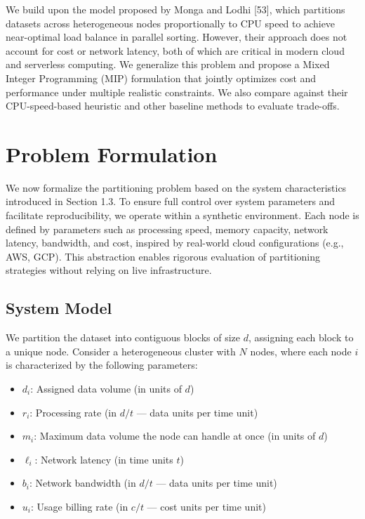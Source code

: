 \documentclass[]{interact}
\theoremstyle{plain}
\theoremstyle{definition}
\theoremstyle{remark}
\begin{document}
We build upon the model proposed by Monga and Lodhi [53], which partitions datasets across heterogeneous nodes proportionally to CPU speed to achieve near-optimal load balance in parallel sorting. However, their approach does not account for cost or network latency, both of which are critical in modern cloud and serverless computing. We generalize this problem and propose a Mixed Integer Programming (MIP) formulation that jointly optimizes cost and performance under multiple realistic constraints. We also compare against their CPU-speed-based heuristic and other baseline methods to evaluate trade-offs.





\section{Problem Formulation}

We now formalize the partitioning problem based on the system characteristics introduced in Section 1.3. To ensure full control over system parameters and facilitate reproducibility, we operate within a synthetic environment. Each node is defined by parameters such as processing speed, memory capacity, network latency, bandwidth, and cost, inspired by real-world cloud configurations (e.g., AWS, GCP). This abstraction enables rigorous evaluation of partitioning strategies without relying on live infrastructure.

\subsection{System Model}

We partition the dataset into contiguous blocks of size $d$, assigning each block to a unique node. Consider a heterogeneous cluster with $N$ nodes, where each node $i$ is characterized by the following parameters:

\begin{itemize}
    \item $d_i$: Assigned data volume (in units of $d$)
    \item $r_i$: Processing rate (in $d/t$ — data units per time unit)
    \item $m_i$: Maximum data volume the node can handle at once (in units of $d$)
    \item $\ell_i$: Network latency (in time units $t$)
    \item $b_i$: Network bandwidth (in $d/t$ — data units per time unit)
    \item $u_i$: Usage billing rate (in $c/t$ — cost units per time unit)
\end{itemize}
\end{document}
